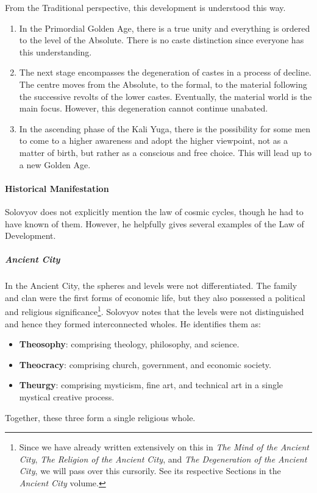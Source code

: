 From the Traditional perspective, this development is understood this way.

\begin{enumerate}
\item In the Primordial Golden Age, there is a true unity and everything is ordered to the level of the Absolute. There is no caste distinction since everyone has this understanding. 
\item The next stage encompasses the degeneration of castes in a process of decline. The centre moves from the Absolute, to the formal, to the material following the successive revolts of the lower castes. Eventually, the material world is the main focus. However, this degeneration cannot continue unabated. 
\item In the ascending phase of the Kali Yuga, there is the possibility for some men to come to a higher awareness and adopt the higher viewpoint, not as a matter of birth, but rather as a conscious and free choice. This will lead up to a new Golden Age. 
\end{enumerate}
\paragraph{Historical Manifestation}
Solovyov does not explicitly mention the law of cosmic cycles, though he had to have known of them. However, he helpfully gives several examples of the Law of Development.

\subparagraph{Ancient City}
In the Ancient City, the spheres and levels were not differentiated. The family and clan were the first forms of economic life, but they also possessed a political and religious significance\footnote{Since we have already written extensively on this in \textit{The Mind of the Ancient City}, \textit{The Religion of the Ancient City}, and \textit{The Degeneration of the Ancient City}, we will pass over this cursorily. See its respective Sections in the \textit{Ancient City} volume.}. Solovyov notes that the levels were not distinguished and hence they formed interconnected wholes. He identifies them as:

\begin{itemize}
\item \textbf{Theosophy}: comprising theology, philosophy, and science. 
\item \textbf{Theocracy}: comprising church, government, and economic society. 
\item \textbf{Theurgy}: comprising mysticism, fine art, and technical art in a single mystical creative process. 
\end{itemize}
Together, these three form a single religious whole.

